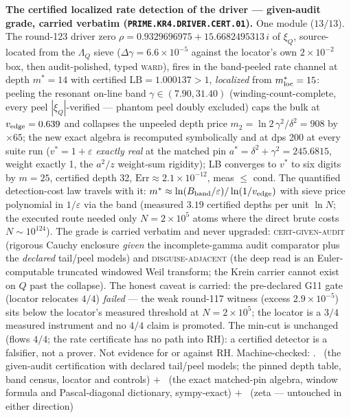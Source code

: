 \par\smallskip\noindent\textbf{The certified localized rate
detection of the driver --- given-audit grade, carried verbatim
(\texttt{PRIME.KR4.\allowbreak DRIVER.\allowbreak CERT.01}).}
One module ($13/13$).  The round-123 driver zero
$\rho = 0.9329696975 + 15.6682495313\,i$ of $\xi_Q$,
source-located from the $\Lambda_Q$ sieve
($\Delta\gamma = 6.6\times10^{-5}$ against the locator's own
$2\times10^{-2}$ box, then audit-polished, typed \textsc{ward}),
fires in the band-peeled rate channel at depth $m^* = 14$ with
certified $\mathrm{LB} = 1.000137 > 1$, \emph{localized} from
$m^*_{\rm loc} = 15$: peeling the resonant on-line band
$\gamma \in (7.90, 31.40)$ (winding-count-complete, every peel
$|\xi_Q|$-verified --- phantom peel doubly excluded) caps the
bulk at $v_{\rm edge} = 0.639$ and collapses the unpeeled depth
price $m_2 = \ln 2\,\gamma^2/\delta^2 = 908$ by $\times 65$; the
new exact algebra is recomputed symbolically and at dps 200 at
every suite run ($v^* = 1 + \varepsilon$ \emph{exactly real} at
the matched pin $a^* = \delta^2 + \gamma^2 = 245.6815$, weight
exactly 1, the $a^2/z$ weight-sum rigidity); LB converges to
$v^*$ to six digits by $m = 25$, certified depth 32,
$\mathrm{Err} \approx 2.1\times10^{-12}$, meas $\le$ cond.  The
quantified detection-cost law travels with it:
$m^* \approx \ln(B_{\rm band}/\varepsilon)/\ln(1/v_{\rm edge})$
with sieve price polynomial in $1/\varepsilon$ via the band
(measured $3.19$ certified depths per unit $\ln N$; the executed
route needed only $N = 2\times10^5$ atoms where the direct brute
costs $N \sim 10^{124}$).  The grade is carried verbatim and
never upgraded: \textsc{cert-given-audit} (rigorous Cauchy
enclosure \emph{given} the incomplete-gamma audit comparator plus
the \emph{declared} tail/peel models) and
\textsc{disguise-adjacent} (the deep read is an Euler-computable
truncated windowed Weil transform; the Krein carrier cannot exist
on $Q$ past the collapse).  The honest caveat is carried: the
pre-declared G11 gate (locator relocates $4/4$) \emph{failed} ---
the weak round-117 witness (excess $2.9\times10^{-5}$) sits below
the locator's measured threshold at $N = 2\times10^5$; the
locator is a $3/4$ measured instrument and no $4/4$ claim is
promoted.  The min-cut is unchanged (flows $4/4$; the rate
certificate has no path into RH): a certified detector is a
falsifier, not a prover.  Not evidence for or against RH.
Machine-checked: .
\mC\ (the given-audit certification with declared tail/peel
models; the pinned depth table, band census, locator and
controls) $+$ \mE\ (the exact matched-pin algebra, window
formula and Pascal-diagonal dictionary, sympy-exact) $+$ \mO\
(zeta --- untouched in either direction)
\par\smallskip


